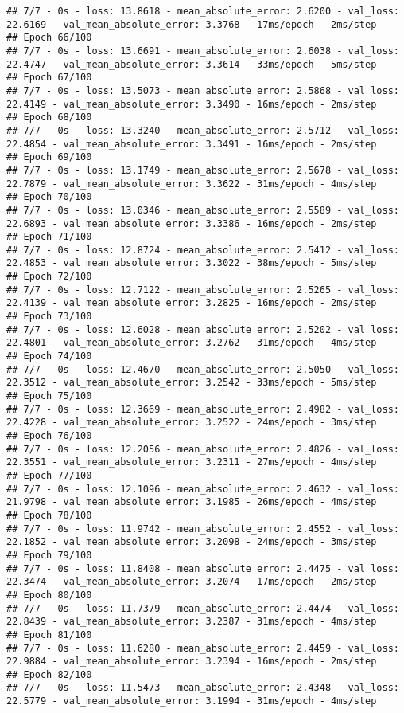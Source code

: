 \documentclass[
]{article}
\begin{document}
\begin{verbatim}
## 7/7 - 0s - loss: 13.8618 - mean_absolute_error: 2.6200 - val_loss: 22.6169 - val_mean_absolute_error: 3.3768 - 17ms/epoch - 2ms/step
## Epoch 66/100
## 7/7 - 0s - loss: 13.6691 - mean_absolute_error: 2.6038 - val_loss: 22.4747 - val_mean_absolute_error: 3.3614 - 33ms/epoch - 5ms/step
## Epoch 67/100
## 7/7 - 0s - loss: 13.5073 - mean_absolute_error: 2.5868 - val_loss: 22.4149 - val_mean_absolute_error: 3.3490 - 16ms/epoch - 2ms/step
## Epoch 68/100
## 7/7 - 0s - loss: 13.3240 - mean_absolute_error: 2.5712 - val_loss: 22.4854 - val_mean_absolute_error: 3.3491 - 16ms/epoch - 2ms/step
## Epoch 69/100
## 7/7 - 0s - loss: 13.1749 - mean_absolute_error: 2.5678 - val_loss: 22.7879 - val_mean_absolute_error: 3.3622 - 31ms/epoch - 4ms/step
## Epoch 70/100
## 7/7 - 0s - loss: 13.0346 - mean_absolute_error: 2.5589 - val_loss: 22.6893 - val_mean_absolute_error: 3.3386 - 16ms/epoch - 2ms/step
## Epoch 71/100
## 7/7 - 0s - loss: 12.8724 - mean_absolute_error: 2.5412 - val_loss: 22.4853 - val_mean_absolute_error: 3.3022 - 38ms/epoch - 5ms/step
## Epoch 72/100
## 7/7 - 0s - loss: 12.7122 - mean_absolute_error: 2.5265 - val_loss: 22.4139 - val_mean_absolute_error: 3.2825 - 16ms/epoch - 2ms/step
## Epoch 73/100
## 7/7 - 0s - loss: 12.6028 - mean_absolute_error: 2.5202 - val_loss: 22.4801 - val_mean_absolute_error: 3.2762 - 31ms/epoch - 4ms/step
## Epoch 74/100
## 7/7 - 0s - loss: 12.4670 - mean_absolute_error: 2.5050 - val_loss: 22.3512 - val_mean_absolute_error: 3.2542 - 33ms/epoch - 5ms/step
## Epoch 75/100
## 7/7 - 0s - loss: 12.3669 - mean_absolute_error: 2.4982 - val_loss: 22.4228 - val_mean_absolute_error: 3.2522 - 24ms/epoch - 3ms/step
## Epoch 76/100
## 7/7 - 0s - loss: 12.2056 - mean_absolute_error: 2.4826 - val_loss: 22.3551 - val_mean_absolute_error: 3.2311 - 27ms/epoch - 4ms/step
## Epoch 77/100
## 7/7 - 0s - loss: 12.1096 - mean_absolute_error: 2.4632 - val_loss: 21.9798 - val_mean_absolute_error: 3.1985 - 26ms/epoch - 4ms/step
## Epoch 78/100
## 7/7 - 0s - loss: 11.9742 - mean_absolute_error: 2.4552 - val_loss: 22.1852 - val_mean_absolute_error: 3.2098 - 24ms/epoch - 3ms/step
## Epoch 79/100
## 7/7 - 0s - loss: 11.8408 - mean_absolute_error: 2.4475 - val_loss: 22.3474 - val_mean_absolute_error: 3.2074 - 17ms/epoch - 2ms/step
## Epoch 80/100
## 7/7 - 0s - loss: 11.7379 - mean_absolute_error: 2.4474 - val_loss: 22.8439 - val_mean_absolute_error: 3.2387 - 31ms/epoch - 4ms/step
## Epoch 81/100
## 7/7 - 0s - loss: 11.6280 - mean_absolute_error: 2.4459 - val_loss: 22.9884 - val_mean_absolute_error: 3.2394 - 16ms/epoch - 2ms/step
## Epoch 82/100
## 7/7 - 0s - loss: 11.5473 - mean_absolute_error: 2.4348 - val_loss: 22.5779 - val_mean_absolute_error: 3.1994 - 31ms/epoch - 4ms/step

\end{verbatim}
\end{document}
